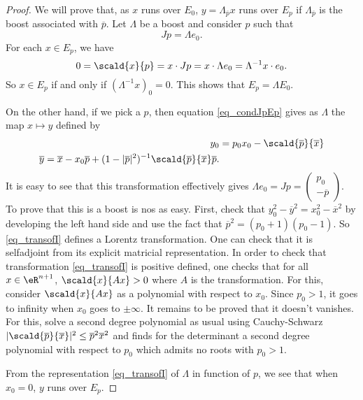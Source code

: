 \begin{proof}
	We will prove that, as $x$ runs over $E_0$, $y=\Lambda_{\overline{p}}x$ runs over $E_p$ if $\Lambda_{\overline{p}}$ is the boost associated with $\overline{p}$. Let $\Lambda$ be a boost and consider $p$ such that
	\begin{equation}  \label{eq_condJpEp}
		Jp=\Lambda e_0.
	\end{equation}
	For each $x\in E_p$, we have
	\[
		0=\scald{ x }{ p }=x\cdot Jp=x\cdot\Lambda e_0=\Lambda^{-1}x\cdot e_0.
	\]
	So $x\in E_p$ if and only if $(\Lambda^{-1}x)_0=0$. This shows that $E_p=\Lambda E_0$.

	On the other hand, if we pick a $p$, then equation \eqref{eq_condJpEp} gives as $\Lambda$ the map $x\mapsto y$ defined by
	\begin{subequations} \label{eq_transofI}
		\begin{align}
			y_0 & =p_0x_0-\scald{ \overline{p} }{ \overline{x} } \\
			\overline{ y }=\overline{x}-x_0\overline{p}+(1-|\overline{p}|^2)^{-1}\scald{ \overline{p} }{ \overline{x} }\overline{p}.
		\end{align}
	\end{subequations}
	It is easy to see that this transformation effectively gives $\Lambda e_0=Jp=
		\begin{pmatrix}
			p_0 \\-\overline{p}
		\end{pmatrix}
	$. To prove that this is a boost is nos as easy. First, check that $y_0^2-\overline{ y }^2=x_0^2-\overline{x}^2$ by developing the left hand side and use the fact that $\overline{p}^2=(p_0+1)(p_0-1)$. So \eqref{eq_transofI} defines a Lorentz transformation. One can check that it is selfadjoint from its explicit matricial representation. In order to check that transformation \eqref{eq_transofI} is positive defined, one checks that for all $x\in\eR^{n+1}$,  $\scald{ x }{ Ax }>0$ where $A$ is the transformation. For this, consider $\scald{ x }{ Ax }$ as a polynomial with respect to $x_0$. Since $p_0>1$, it goes to infinity when $x_0$ goes to $\pm\infty$. It remains to be proved that it doesn't vanishes. For this, solve a second degree polynomial as usual using Cauchy-Schwarz $| \scald{ \overline{p} }{ \overline{x} } |^2\leq \overline{p}^2\overline{x}^2$ and finds for the determinant a second degree polynomial with respect to $p_0$ which admits no roots with $p_0>1$.

	From the representation \eqref{eq_transofI} of $\Lambda$ in function of $p$, we see that when $x_0=0$, $y$ runs over $E_p$.

\end{proof}

